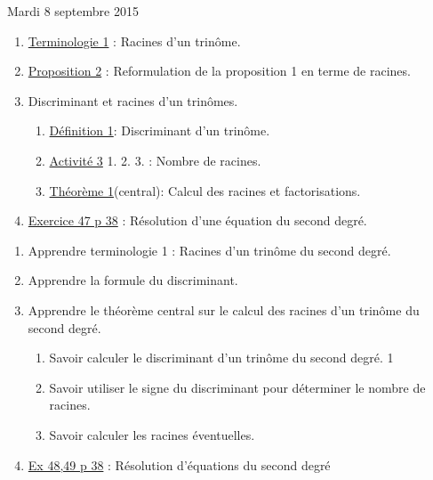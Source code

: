 \documentclass[a4paper,11pt]{article}
\theoremstyle{break}
\begin{document}
  
  Mardi 8 septembre 2015
  \begin{enumerate}   
    \item 
    \href{https://github.com/mathlorgues/math1sd1516/blob/master/20150907/definitions.pdf}
    {Terminologie 1} : Racines d'un trinôme.
    \item 
    \href{https://github.com/mathlorgues/math1sd1516/blob/master/20150907/propositions.pdf}
    {Proposition 2} : Reformulation de la proposition 1 en terme de racines.
    \item Discriminant et racines d'un trinômes.
    \begin{enumerate}
      \item 
      \href{https://github.com/mathlorgues/math1sd1516/blob/master/20150908/definitions.pdf}
      {Définition 1}: Discriminant d'un trinôme.
      \item 
      \href{https://github.com/mathlorgues/math1sd1516/blob/master/20150908/activite.pdf}
      {Activité 3} 1. 2. 3. : Nombre de racines.
      \item 
      \href{https://github.com/mathlorgues/math1sd1516/blob/master/20150908/propositions.pdf}
      {Théorème 1}(central): Calcul des racines et factorisations.
    \end{enumerate}
    \item 
    \href{https://github.com/mathlorgues/math1sd1516/blob/master/images/47-52p38.png}
    {Exercice 47 p 38} : Résolution d'une équation du second degré.
    
    
    
  \end{enumerate}
  
  \begin{Dev}
    
    \begin{enumerate}
      
      \item Apprendre terminologie 1 : Racines d'un trinôme du second degré.
      \item Apprendre la formule du discriminant.
      \item Apprendre le théorème central sur le calcul des racines 
      d'un trinôme du second degré.
      \begin{enumerate}
	\item Savoir calculer le discriminant d'un trinôme du second degré. 1
	\item Savoir utiliser le signe du discriminant pour déterminer
	le nombre de racines.
	\item Savoir calculer les racines éventuelles.
      \end{enumerate}
      \item  
      \href{https://github.com/mathlorgues/math1sd1516/blob/master/images/47-52p38.png}
      {Ex 48,49 p 38} : 
      Résolution d'équations du second degré
      
      
    \end{enumerate}
  \end{Dev}
  \newpage
  
\end{document}
